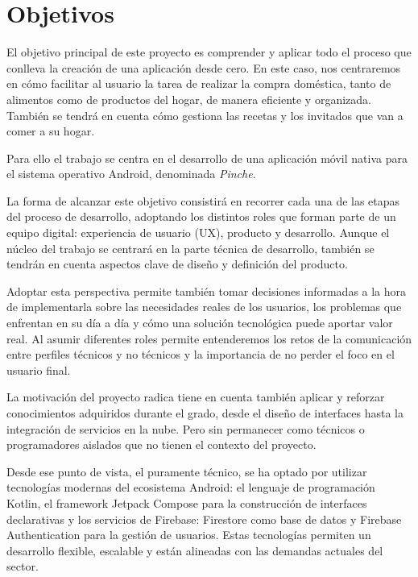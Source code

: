 \cleardoublepage %
\chapter{Objetivos} %
\label{chap:objetivos} %

El objetivo principal de este proyecto es comprender y aplicar todo el proceso que conlleva la creación de una aplicación desde cero. En este caso, nos centraremos en cómo facilitar al usuario la tarea de realizar la compra doméstica, tanto de alimentos como de productos del hogar, de manera eficiente y organizada. También se tendrá en cuenta cómo gestiona las recetas y los invitados que van a comer a su hogar.

Para ello el trabajo se centra en el desarrollo de una aplicación móvil nativa para el sistema operativo Android, denominada \textit{Pinche}.

La forma de alcanzar este objetivo consistirá en recorrer cada una de las etapas del proceso de desarrollo, adoptando los distintos roles que forman parte de un equipo digital: experiencia de usuario (UX), producto y desarrollo. Aunque el núcleo del trabajo se centrará en la parte técnica de desarrollo, también se tendrán en cuenta aspectos clave de diseño y definición del producto.

Adoptar esta perspectiva permite también tomar decisiones informadas a la hora de implementarla sobre las necesidades reales de los usuarios, los problemas que enfrentan en su día a día y cómo una solución tecnológica puede aportar valor real. Al asumir diferentes roles permite entenderemos los retos de la comunicación entre perfiles técnicos y no técnicos y la importancia de no perder el foco en el usuario final.

La motivación del proyecto radica tiene en cuenta también aplicar y reforzar conocimientos adquiridos durante el grado, desde el diseño de interfaces hasta la integración de servicios en la nube. Pero sin permanecer como técnicos o programadores aislados que no tienen el contexto del proyecto.

Desde ese punto de vista, el puramente técnico, se ha optado por utilizar tecnologías modernas del ecosistema Android: el lenguaje de programación Kotlin, el framework Jetpack Compose para la construcción de interfaces declarativas y los servicios de Firebase: Firestore como base de datos y Firebase Authentication para la gestión de usuarios. Estas tecnologías permiten un desarrollo flexible, escalable y están alineadas con las demandas actuales del sector.


